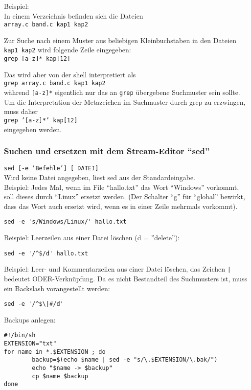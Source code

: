 \documentclass[11pt]{article}
\begin{document}
Beispiel:\\
In einem Verzeichnis befinden sich die Dateien\\ 
\texttt{array.c band.c kap1 kap2}

Zur Suche nach einem Muster aus beliebigen Kleinbuchstaben in den
Dateien \texttt{kap1 kap2} wird folgende Zeile eingegeben:\\
\texttt{grep [a-z]* kap[12]}

Das wird aber von der shell interpretiert als\\
\texttt{grep array.c band.c kap1 kap2} \\
während \texttt{[a-z]*} eigentlich nur das an \texttt{grep} übergebene
Suchmuster sein sollte. Um die Interpretation der Metazeichen im
Suchmuster durch grep zu erzwingen, muss daher\\
\texttt{grep '[a-z]*' kap[12]}\\
eingegeben werden.\\

\subsubsection{Suchen und ersetzen mit dem Stream-Editor ``sed''}

\texttt{sed [-e 'Befehle'] [ DATEI]} \\
Wird keine Datei angegeben, liest sed aus der Standardeingabe.\\

Beispiel: Jedes Mal, wenn im File ``hallo.txt'' das Wort ``Windows''  vorkommt,
soll dieses durch ``Linux'' ersetzt werden. (Der Schalter ``g'' für ``global''
bewirkt, dass das Wort auch ersetzt wird, wenn es in einer Zeile mehrmals vorkommt).
\begin{verbatim}
sed -e 's/Windows/Linux/' hallo.txt
\end{verbatim}

Beispiel: Leerzeilen aus einer Datei löschen (d = ''delete''):
\begin{verbatim}
sed -e '/^$/d' hallo.txt
\end{verbatim}

Beispiel: Leer- und Kommentarzeilen aus einer Datei löschen, das Zeichen \texttt{|} 
bedeutet ODER-Verknüpfung. Da es nicht Bestandteil des Suchmusters ist, muss ein 
Backslash vorangestellt werden:
\begin{verbatim}
sed -e '/^$\|#/d'
\end{verbatim}

Backups anlegen:
\begin{verbatim}
#!/bin/sh
EXTENSION="txt"
for name in *.$EXTENSION ; do
        backup=$(echo $name | sed -e "s/\.$EXTENSION/\.bak/")
        echo "$name -> $backup"
        cp $name $backup
done
\end{verbatim}
\end{document}
